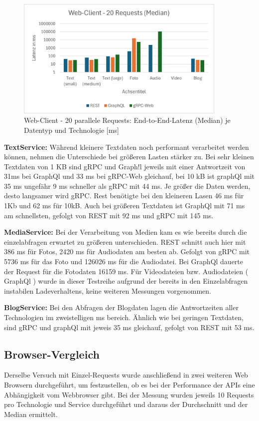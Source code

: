 \begin{figure}[htbp]
	\centering
	\includegraphics[width=0.9\textwidth]{images/Parallelrequests.png}
	\caption{Web-Client - 20 parallele Requests: End-to-End-Latenz (Median) je Datentyp und Technologie [ms]}
	\label{fig:webclient-20req-median}
\end{figure}

\textbf{TextService:}  
Während kleinere Textdaten noch performant verarbeitet werden können, nehmen die Unterschiede bei größeren Lasten stärker zu. Bei sehr kleinen Textdaten von 1 KB sind gRPC und Graph!l jeweils mit einer Antwortzeit von 31ms bei GraphQl und 33 ms bei gRPC-Web gleichauf, bei 10 kB ist graphQl mit 35 ms ungefähr 9 ms schneller als gRPC mit 44 ms. Je größer die Daten werden, desto langsamer wird gRPC. Rest benötigte bei den kleineren Lasen 46 ms für 1Kb und 62 ms für 10kB. Auch bei größeren Textdaten ist GraphQl mit 71 ms am schnellsten, gefolgt von REST mit 92 ms und gRPC mit 145 ms. 

\textbf{MediaService:}  
Bei der Verarbeitung von Medien kam es wie bereits durch die einzelabfragen erwartet zu größeren unterschieden. REST schnitt auch hier mit 386 ms für Fotos, 2420 ms für Audiodaten am besten ab. Gefolgt von gRPC mit 5736 ms für das Foto und 126026 ms für die Audiodatei. Bei GraphQl dauerte der Request für die Fotodaten 16159 ms.
Für Videodateien bzw. Audiodateien ( GraphQl ) wurde in dieser Testreihe aufgrund der bereits in den Einzelabfragen instabilen Ladeverhaltens, keine weiteren Messungen vorgenommen.


\textbf{BlogService:}  
Bei den Abfragen der Blogdaten lagen die Antwortzeiten aller Technologien im zweistelligen ms bereich. Ähnlich wie bei geringen Textdaten, sind gRPC und graphQl mit jeweis 35 ms gleichauf, gefolgt von REST mit 53 ms.

\clearpage
\subsection{Browser-Vergleich}
Derselbe Versuch mit Einzel-Requests wurde anschließend in zwei weiteren Web Browsern durchgeführt, um festzustellen, ob es bei der Performance der APIs eine Abhängigkeit vom Webbrowser gibt. 
Bei der Messung wurden jeweils 10 Requests pro Technologie und Service durchgeführt und daraus der Durchschnitt und der Median ermittelt.

